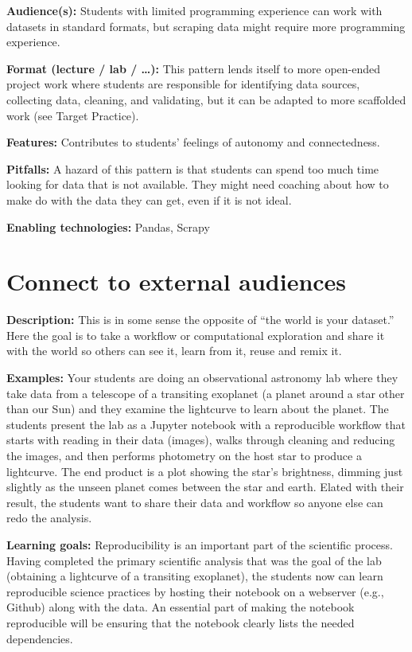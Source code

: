 \documentclass[]{book}
\begin{document}
\textbf{Audience(s):} Students with limited programming experience can
work with datasets in standard formats, but scraping data might require
more programming experience.

\textbf{Format (lecture / lab / \ldots{}):} This pattern lends itself to
more open-ended project work where students are responsible for
identifying data sources, collecting data, cleaning, and validating, but
it can be adapted to more scaffolded work (see Target Practice).

\textbf{Features:} Contributes to students' feelings of autonomy and
connectedness.

\textbf{Pitfalls:} A hazard of this pattern is that students can spend
too much time looking for data that is not available. They might need
coaching about how to make do with the data they can get, even if it is
not ideal.

\textbf{Enabling technologies:} Pandas, Scrapy

\section{Connect to external
audiences}\label{connect-to-external-audiences}

\textbf{Description:} This is in some sense the opposite of ``the world
is your dataset.'' Here the goal is to take a workflow or computational
exploration and share it with the world so others can see it, learn from
it, reuse and remix it.

\textbf{Examples:} Your students are doing an observational astronomy
lab where they take data from a telescope of a transiting exoplanet (a
planet around a star other than our Sun) and they examine the lightcurve
to learn about the planet. The students present the lab as a Jupyter
notebook with a reproducible workflow that starts with reading in their
data (images), walks through cleaning and reducing the images, and then
performs photometry on the host star to produce a lightcurve. The end
product is a plot showing the star's brightness, dimming just slightly
as the unseen planet comes between the star and earth. Elated with their
result, the students want to share their data and workflow so anyone
else can redo the analysis.

\textbf{Learning goals:} Reproducibility is an important part of the
scientific process. Having completed the primary scientific analysis
that was the goal of the lab (obtaining a lightcurve of a transiting
exoplanet), the students now can learn reproducible science practices by
hosting their notebook on a webserver (e.g., Github) along with the
data. An essential part of making the notebook reproducible will be
ensuring that the notebook clearly lists the needed dependencies.
\end{document}
